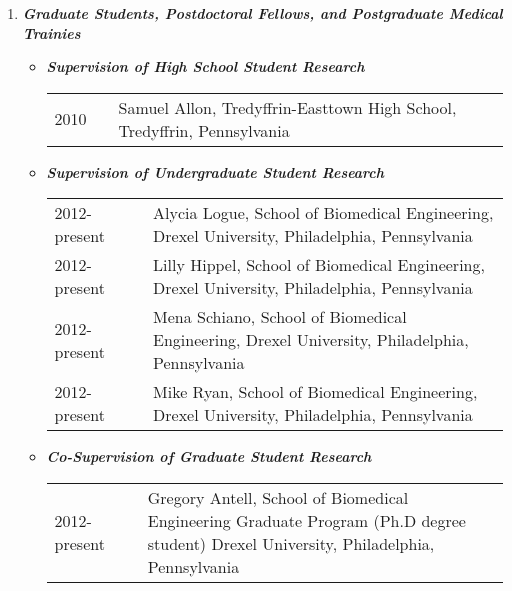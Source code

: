 \documentclass[a4paper,11pt]{article}
\begin{document}
\begin{enumerate}
\begin{itemize}
 \end{itemize}
 

 \item {\LARGE \itshape \bfseries Graduate Students, Postdoctoral Fellows, and Postgraduate Medical Trainies}
 \begin{itemize}
 
 \item[] {\Large \bfseries \itshape Supervision of High School Student Research}
 \begin{longtable}{p{}p{}p{}}
  2010 & & Samuel Allon, Tredyffrin-Easttown High School, Tredyffrin, Pennsylvania\\
  \end{longtable}
 \item[] {\Large \bfseries \itshape Supervision of Undergraduate Student Research}
 
   \begin{longtable}{p{}p{}p{}}
  2012-present & & Alycia Logue, School of Biomedical Engineering, Drexel University, Philadelphia, Pennsylvania\\
  2012-present & & Lilly Hippel, School of Biomedical Engineering, Drexel University, Philadelphia, Pennsylvania\\
  2012-present & & Mena Schiano, School of Biomedical Engineering, Drexel University, Philadelphia, Pennsylvania\\
  2012-present & & Mike Ryan, School of Biomedical Engineering, Drexel University, Philadelphia, Pennsylvania\\
  \end{longtable}

  \item[] {\Large \bfseries \itshape Co-Supervision of Graduate Student Research}
    \begin{longtable}{p{}p{}p{}}
  2012-present & & Gregory Antell, School of Biomedical Engineering Graduate Program (Ph.D degree student) Drexel University, Philadelphia, Pennsylvania
  \end{longtable}
 \end{itemize}


\end{enumerate}
\end{document}
